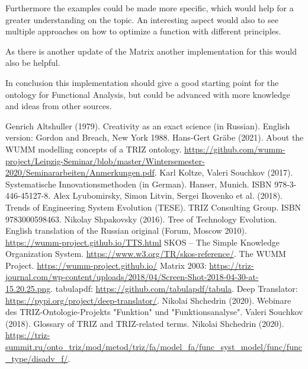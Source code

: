 \documentclass[11pt,a4paper]{article}
\begin{document}
Furthermore the examples could be made more specific, which would help for a
greater understanding on the topic.  An interesting aspect would also to see
multiple approaches on how to optimize a function with different principles.

As there is another update of the Matrix another implementation for this would
also be helpful.

In conclusion this implementation should give a good starting point for the
ontology for Functional Analysis, but could be advanced with more knowledge
and ideas from other sources.

\begin{thebibliography}{xxx}
\raggedright
{} Genrich Altshuller (1979).  Creativity as an exact
  science (in Russian). English version: Gordon and Breach, New York 1988.
 Hans-Gert Gr\"abe (2021). About the WUMM modelling
  concepts of a TRIZ ontology.
  \url{https://github.com/wumm-project/Leipzig-Seminar/blob/master/Wintersemester-2020/Seminararbeiten/Anmerkungen.pdf}.
 Karl Koltze, Valeri Souchkov (2017).  Systematische
  Innovationsmethoden (in German).  Hanser, Munich. ISBN 978-3-446-45127-8.
 Alex Lyubomirsky, Simon Litvin, Sergei Ikovenko et al.
  (2018). Trends of Engineering System Evolution (TESE).  TRIZ Consulting
  Group. ISBN 9783000598463.
 Nikolay Shpakovsky (2016). Tree of Technology
  Evolution. English translation of the Russian original (Forum, Moscow
  2010).\\ \url{https://wumm-project.github.io/TTS.html}
 SKOS -- The Simple Knowledge Organization System.
  \url{https://www.w3.org/TR/skos-reference/}.  
 The WUMM Project. \url{https://wumm-project.github.io/} 
 Matrix 2003:
  \url{https://triz-journal.com/wp-content/uploads/2018/04/Screen-Shot-2018-04-30-at-15.20.25.png}.
 tabulapdf: \url{https://github.com/tabulapdf/tabula}.
 Deep Translator:
  \url{https://pypi.org/project/deep-translator/}.
 Nikolai Shchedrin (2020). Webinare des
  TRIZ-Ontologie-Projekts "Funktion" und "Funktionsanalyse".
 Valeri Souchkov (2018). Glossary of TRIZ and
  TRIZ-related terms.
 Nikolai Shchedrin (2020).
  \url{https://triz-summit.ru/onto_triz/mod/metod/triz/fa/model_fa/func_syst_model/func/func_type/disadv_f/}.
\end{thebibliography}
\end{document}
